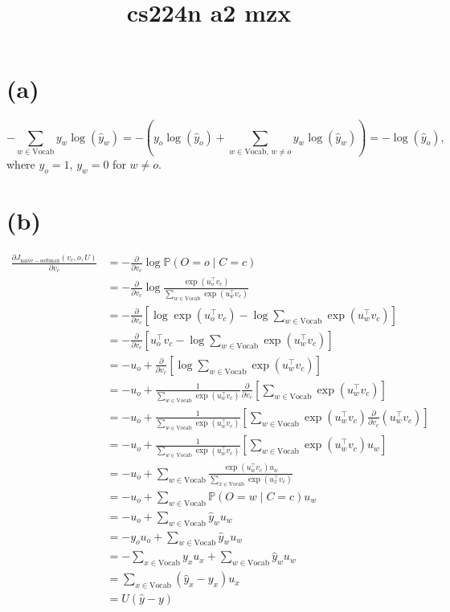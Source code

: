 \documentclass[12pt]{article}
\begin{document}
\title{cs224n a2 mzx}
\maketitle

\section*{(a)}

\[
    -\sum_{w \in \mathrm{Vocab}} y_w \log(\hat{y}_{w}) = - ( y_{o} \log (\hat{y}_{o}) + \sum_{w \in \mathrm{Vocab},\, w \neq o} y_{w} \log (\hat{y}_{w}) ) = - \log (\hat{y}_{o}), 
\]
where $y_o = 1$, $y_w = 0$ for $w \neq o$.

\section*{(b)}
\begin{align*}
    \frac{\partial J_{\mathrm{naive-softmax}}(v_c, o, U)}{\partial v_{c}} 
    &= - \frac{\partial }{\partial v_{c}} \log \mathbb{P}(O=o \mid C=c) \\
    &= - \frac{\partial }{\partial v_{c}} \log \frac{\exp(u_{o}^{\top}v_{c})}{\sum_{w \in \mathrm{Vocab}} \exp(u_{w}^{\top}v_{c})} \\
    &= - \frac{\partial }{\partial v_{c}} \left[ \log \exp(u_{o}^{\top}v_{c}) - \log \sum_{w \in \mathrm{Vocab}} \exp(u_{w}^{\top}v_{c}) \right] \\
    &= - \frac{\partial }{\partial v_{c}} \left[ u_{o}^{\top}v_{c} - \log \sum_{w \in \mathrm{Vocab}} \exp(u_{w}^{\top}v_{c}) \right] \\
    &= -u_{o} + \frac{\partial }{\partial v_{c}} \left[  \log \sum_{w \in \mathrm{Vocab}} \exp(u_{w}^{\top}v_{c}) \right] \\
    &= -u_{o} + \frac{1}{\sum_{w \in \mathrm{Vocab}} \exp(u_{w}^{\top}v_{c})} \frac{\partial }{\partial v_{c}} \left[ \sum_{w \in \mathrm{Vocab}} \exp(u_{w}^{\top}v_{c}) \right] \\
    &= -u_{o} + \frac{1}{\sum_{w \in \mathrm{Vocab}} \exp(u_{w}^{\top}v_{c})}  \left[ \sum_{w \in \mathrm{Vocab}} \exp(u_{w}^{\top}v_{c}) \frac{\partial }{\partial v_{c}} (u_{w}^{\top}v_{c}) \right] \\
    &= -u_{o} + \frac{1}{\sum_{w \in \mathrm{Vocab}} \exp(u_{w}^{\top}v_{c})}  \left[ \sum_{w \in \mathrm{Vocab}} \exp(u_{w}^{\top}v_{c}) u_{w} \right] \\
    &= -u_{o} +  \sum_{w \in \mathrm{Vocab}} \frac{\exp(u_{w}^{\top}v_{c}) u_{w}}{\sum_{x \in \mathrm{Vocab}} \exp(u_{x}^{\top}v_{c})}\\
    &= -u_{o} + \sum_{w \in \mathrm{Vocab}}\mathbb{P}( O=w \mid C=c )u_{w}\\
    &= -u_{o} + \sum_{w \in \mathrm{Vocab}}\hat{y}_{w}u_{w}\\
    &= -y_{o}u_{o} + \sum_{w \in \mathrm{Vocab}}\hat{y}_{w}u_{w}\\
    &= - \sum_{x \in \mathrm{Vocab}}y_{x}u_{x} + \sum_{w \in \mathrm{Vocab}}\hat{y}_{w}u_{w}\\
    &= \sum_{x \in \mathrm{Vocab}}(\hat{y}_x - y_{x})u_{x} \\
    &= U(\hat{y} - y)
\end{align*}
\end{document}
